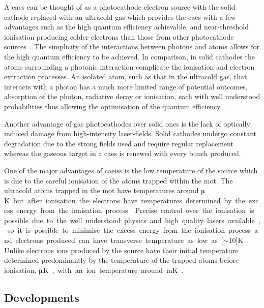 A \gls{caes} can be thought of as a photocathode electron source with the solid cathode replaced with an ultracold gas which provides the \gls{caes} with a few advantages such as the high quantum efficiency achievable, and near-threshold ionisation producing colder electrons than those from other photocathode sources~\cite{engelen_effective_2014}.
The simplicity of the interactions between photons and atoms allows for the high quantum efficiency to be achieved.
In comparison, in solid cathodes the atoms surrounding a photonic interaction complicate the ionisation and electron extraction processes.
An isolated atom, such as that in the ultracold gas, that interacts with a photon has a much more limited range of potential outcomes, absorption of the photon, radiative decay or ionisation, each with well understood probabilities thus allowing the optimisation of the quantum efficiency~\cite{baranov_field_1994}.

Another advantage of gas photocathodes over solid ones is the lack of optically induced damage from high-intensity laser-fields.
Solid cathodes undergo constant degradation due to the strong fields used and require regular replacement~\cite{dowell_results_1995} whereas the gaseous target in a \gls{caes} is renewed with every bunch produced.

One of the major advantages of \glspl{caeis} is the low temperature of the source which is due to the careful ionisation of the atoms trapped within the \gls{mot}.
The ultracold atoms trapped in the \gls{mot} have temperatures around \unit[100]{$\muup$K} but after ionisation the electrons have temperatures determined by the excess energy from the ionisation process~\cite{engelen_high-coherence_2013,engelen_analytical_2014,sparkes_high-coherence_2014,speirs_identification_2017}.
Precise control over the ionisation is possible due to the well understood physics and high quality lasers available, so it is possible to minimise the excess energy from the ionisation process and electrons produced can have transverse temperature as low as \unit[$\sim$10]{K}~\cite{saliba_spatial_2012}.
Unlike electrons ions produced by the source have their initial temperature determined predominantly by the temperature of the trapped atoms before ionisation, \unit[100]{$\muup$K}, with an ion temperature around \unit[1]{mK}~\cite{debernardi_measurement_2011,murphy_detailed_2014}.

\subsection{Developments}

